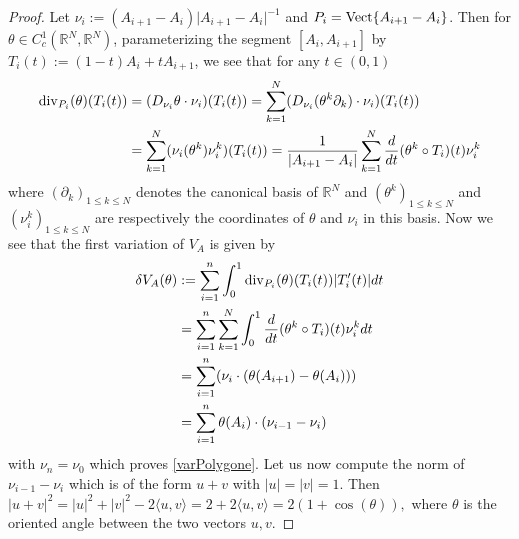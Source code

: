 \documentclass[12pt,english]{smfart} %
\theoremstyle{remark}
\newcommand{\R}{\mathbb{R}}
\newcommand{\Cc}{\mathcal{C}}
\newcommand{\Vect}{{\rm Vect}}
\begin{document}
\begin{proof} Let $ \nu_i := (A_{i+1}-A_i)\vert A_{i+1}-A_i\vert^{-1}$ and $P_i=\Vect\{ A_{i+1}-A_i\}$. Then for $\theta\in C^1_c(\R^N,\R^N)$,  parameterizing the segment $[A_i,A_{i+1}]$ by $T_i(t) := (1-t)A_i + tA_{i+1}$, we see that for any $t\in(0,1)$
\begin{align*}
{\rm div}_{P_i}(\theta)(T_i(t))&=(D_{\nu_i}\theta\cdot\nu_i)(T_i(t))=\sum_{k=1}^N(D_{\nu_i}(\theta^k\partial_k)\cdot\nu_i)(T_i(t))\\
&=\sum_{k=1}^N(\nu_i(\theta^k)\nu_i^k)(T_i(t))=\frac{1}{|A_{i+1}-A_i|}\sum_{k=1}^N\frac{d}{dt}(\theta^k\circ T_i)(t)\nu_i^k
\end{align*}
where $(\partial_k)_{1\leqslant k\leqslant N}$ denotes the canonical basis of $\R^N$ and $(\theta^k)_{1\leqslant k\leqslant N}$ and $(\nu_i^k)_{1\leqslant k\leqslant N}$ are respectively the coordinates of $\theta$ and $\nu_i$ in this basis. Now we see that the first variation of $V_A$ is given by
\begin{align*}
\delta V_A(\theta)&:=\sum_{i=1}^n\int_{0}^1{\rm div}_{P_i}(\theta)(T_i(t))|T_i'(t)|dt\\
&=\sum_{i=1}^n\sum_{k=1}^N\int_{0}^1\frac{d}{dt}(\theta^k\circ T_i)(t)\nu_i^kdt\\
&=\sum_{i=1}^n(\nu_i\cdot(\theta(A_{i+1}) - \theta(A_i)))\\
&=\sum_{i=1}^n\theta(A_i)\cdot(\nu_{i-1}- \nu_i)
\end{align*}
with $\nu_n=\nu_0$ which proves \eqref{varPolygone}.
Let us now compute the norm of $\nu_{i-1}-\nu_i$ which is of the form $u+v$ with $|u|=|v|=1$. Then
$|u+v|^2=|u|^2+|v|^2-2\langle u,v\rangle=2+2\langle u,v\rangle=2(1+\cos(\theta)),$
where $\theta$ is the oriented angle between the two vectors $u,v$. 
\end{proof}
\end{document}
